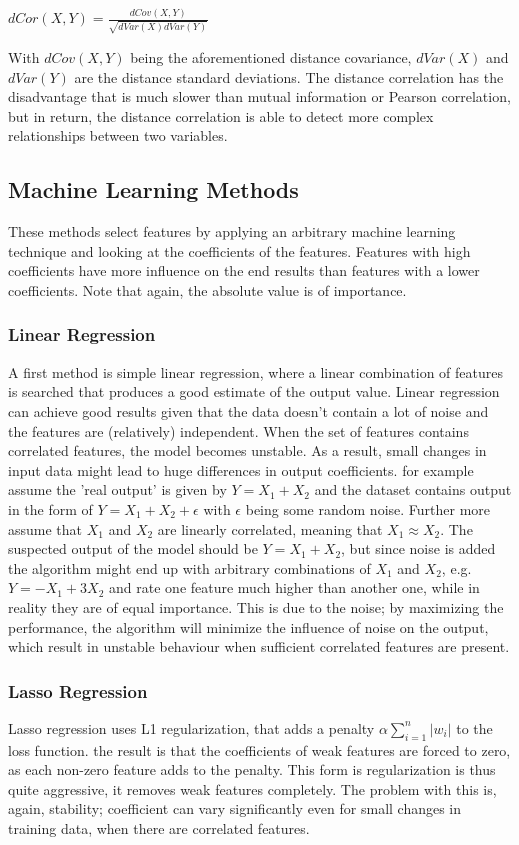 \begin{center}
$dCor(X,Y) = \frac{dCov(X,Y)}{\sqrt{dVar(X)dVar(Y)}}$
\end{center}
With $dCov(X,Y)$ being the aforementioned distance covariance, $dVar(X)$ and $dVar(Y)$ are the distance standard deviations. The distance correlation has the disadvantage that is much slower than mutual information or Pearson correlation, but in return, the distance correlation is able to detect more complex relationships between two variables.

\subsection{Machine Learning Methods}
These methods select features by applying an arbitrary machine learning technique and looking at the coefficients of the features. Features with high coefficients have more influence on the end results than features with a lower coefficients. Note that again, the absolute value is of importance.

\subsubsection{Linear Regression}

A first method is simple linear regression, where a linear combination of features is searched that produces a good estimate of the output value. Linear regression can achieve good results given that the data doesn't contain a lot of noise and the features are (relatively) independent. When the set of features contains correlated features, the model becomes unstable. As a result, small changes in input data might lead to huge differences in output coefficients. for example assume the 'real output' is given by $Y = X_1 + X_2$ and the dataset contains output in the form of $Y = X_1 + X_2 + \epsilon$ with $\epsilon$ being some random noise. Further more assume that $X_1$ and $X_2$ are linearly correlated, meaning that $X_1 \approx X_2$. The suspected output of the model should be $Y = X_1 + X_2$, but since noise is added the algorithm might end up with arbitrary combinations of $X_1$ and $X_2$, e.g. $Y = -X_1 + 3X_2$ and rate one feature much higher than another one, while in reality they are of equal importance. This is due to the noise; by maximizing the performance, the algorithm will minimize the influence of noise on the output, which result in unstable behaviour when sufficient correlated features are present. 

\subsubsection{Lasso Regression}
Lasso regression uses L1 regularization, that adds a penalty $\alpha\sum\limits_{i=1}^{n} |w_i|$ to the loss function. the result is that the coefficients of weak features are forced to zero, as each non-zero feature adds to the penalty. This form is regularization is thus quite aggressive, it removes weak features completely. The problem with this is, again, stability; coefficient can vary significantly even for small changes in training data, when there are correlated features.

